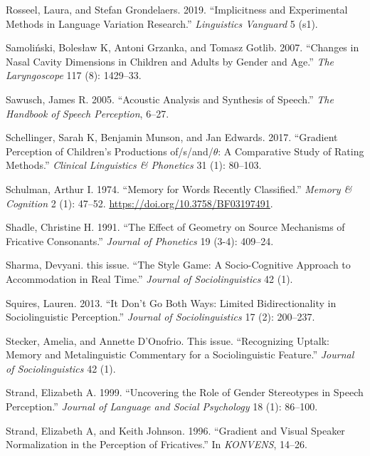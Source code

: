 \documentclass[
  letterpaper,
  DIV=11,
  numbers=noendperiod]{scrartcl}
\newlength{\cslhangindent}
\newenvironment{CSLReferences}[2] %
 {\begin{list}{}{%
  \setlength{\itemindent}{0pt}
  \setlength{\leftmargin}{0pt}
  \setlength{\parsep}{0pt}
  \ifodd #1
   \setlength{\leftmargin}{\cslhangindent}
   \setlength{\itemindent}{-1\cslhangindent}
  \fi
  \setlength{\itemsep}{#2\baselineskip}}}
 {\end{list}}
\begin{document}
\begin{CSLReferences}{1}{0}
Rosseel, Laura, and Stefan Grondelaers. 2019. {``Implicitness and
Experimental Methods in Language Variation Research.''}
\emph{Linguistics Vanguard} 5 (s1).

Samoliński, Bolesław K, Antoni Grzanka, and Tomasz Gotlib. 2007.
{``Changes in Nasal Cavity Dimensions in Children and Adults by Gender
and Age.''} \emph{The Laryngoscope} 117 (8): 1429--33.

Sawusch, James R. 2005. {``Acoustic Analysis and Synthesis of Speech.''}
\emph{The Handbook of Speech Perception}, 6--27.

Schellinger, Sarah K, Benjamin Munson, and Jan Edwards. 2017.
{``Gradient Perception of Children's Productions of/s/and/\(\theta\): A
Comparative Study of Rating Methods.''} \emph{Clinical Linguistics \&
Phonetics} 31 (1): 80--103.

Schulman, Arthur I. 1974. {``Memory for Words Recently Classified.''}
\emph{Memory \& Cognition} 2 (1): 47--52.
\url{https://doi.org/10.3758/BF03197491}.

Shadle, Christine H. 1991. {``The Effect of Geometry on Source
Mechanisms of Fricative Consonants.''} \emph{Journal of Phonetics} 19
(3-4): 409--24.

Sharma, Devyani. this issue. {``The Style Game: A Socio-Cognitive
Approach to Accommodation in Real Time.''} \emph{Journal of
Sociolinguistics} 42 (1).

Squires, Lauren. 2013. {``It Don't Go Both Ways: Limited
Bidirectionality in Sociolinguistic Perception.''} \emph{Journal of
Sociolinguistics} 17 (2): 200--237.

Stecker, Amelia, and Annette D'Onofrio. This issue. {``Recognizing
Uptalk: Memory and Metalinguistic Commentary for a Sociolinguistic
Feature.''} \emph{Journal of Sociolinguistics} 42 (1).

Strand, Elizabeth A. 1999. {``Uncovering the Role of Gender Stereotypes
in Speech Perception.''} \emph{Journal of Language and Social
Psychology} 18 (1): 86--100.

Strand, Elizabeth A, and Keith Johnson. 1996. {``Gradient and Visual
Speaker Normalization in the Perception of Fricatives.''} In
\emph{KONVENS}, 14--26.


\end{CSLReferences}
\end{document}

